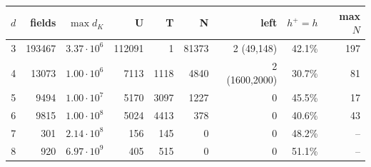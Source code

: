 \begin{tabular}{rrrrrrrrr}
\toprule
$d$ & fields & $\max d_K$ & U & T & N & left & $h^+=h$ & max $N$\\
\midrule
3 & 193467 & $3.37\cdot10^{6}$ & 112091 & 1 & 81373 & 2 (49,148) & 42.1\% & 197\\
4 & 13073 & $1.00\cdot10^{6}$ & 7113 & 1118 & 4840 & 2 (1600,2000) & 30.7\% & 81\\
5 & 9494 & $1.00\cdot10^{7}$ & 5170 & 3097 & 1227 & 0 & 45.5\% & 17\\
6 & 9815 & $1.00\cdot10^{8}$ & 5024 & 4413 & 378 & 0 & 40.6\% & 43\\
7 & 301 & $2.14\cdot10^{8}$ & 156 & 145 & 0 & 0 & 48.2\% & --\\
8 & 920 & $6.97\cdot10^{9}$ & 405 & 515 & 0 & 0 & 51.1\% & --\\
\bottomrule
\end{tabular}
